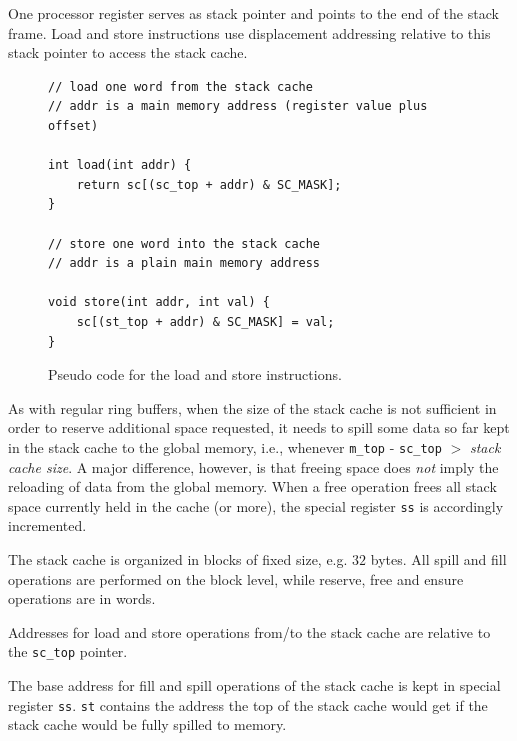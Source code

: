 \documentclass[a4paper,fontsize=10pt,twoside,DIV15,BCOR12mm,headinclude=true,footinclude=false,pagesize,bibtotoc]{scrbook}
\newcommand{\code}[1]{{\texttt{#1}}}
\newcommand{\comment}[3]{

\textsf{\textbf{#1}} {\color{#3}#2}}
\newcommand{\martin}[1]{\comment{Martin}{#1}{Blue}}
\renewcommand{\martin}[1]{}
\begin{document}
One processor register serves as stack pointer and points to the end of the stack frame.
Load and store instructions use displacement addressing relative to this stack pointer
to access the stack cache.

\begin{figure}
\begin{lstlisting}
// load one word from the stack cache
// addr is a main memory address (register value plus offset)

int load(int addr) {
    return sc[(sc_top + addr) & SC_MASK];
}

// store one word into the stack cache
// addr is a plain main memory address

void store(int addr, int val) {
    sc[(st_top + addr) & SC_MASK] = val;
}
\end{lstlisting}
	\caption{Pseudo code for the load and store instructions.}
 	\label{fig:ld_st_iml}
\end{figure}

\martin{We might update this section with more content from the S\$ paper}

As with regular ring buffers, when the size of the stack cache is not sufficient
in order to reserve additional space requested, it needs to spill some data
so far kept in the stack cache to the global memory, i.e., whenever
\code{m\_top} - \code{sc\_top} $>$ \emph{stack cache size}. A major difference,
however, is that freeing space does \emph{not} imply the reloading of data from
the global memory. When a free operation frees all stack space currently held in
the cache (or more), the special register \texttt{ss} is accordingly
incremented.

The stack cache is organized in blocks of fixed size, e.g. $32$ bytes. All
spill and fill operations are performed on the block level, while reserve, free
and ensure operations are in words.
\martin{We agreed that some size values are needed in the compiler to
generate correct code (soon). So we might bring in stack cache manipulation
in burst blocks as well.}

Addresses for load and store operations from/to the stack cache are relative to
the \code{sc\_top} pointer.

The base address for fill and spill operations of the stack cache is kept in
special register \texttt{ss}. \texttt{st} contains the address the top of the
stack cache would get if the stack cache would be fully spilled to memory.
\end{document}
